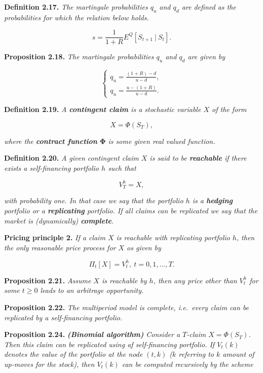 \documentclass[
]{article}
\begin{document}
\textbf{Definition 2.17.} \emph{The martingale probabilities \(q_u\) and
\(q_d\) are defined as the probabilities for which the relation below
holds.}

\[
s=\frac{1}{1+R}E^Q[S_{t+1}\ \vert\ S_t].
\]

\textbf{Proposition 2.18.} \emph{The martingale probabilities \(q_u\)
and \(q_d\) are given by}

\[
\left\{\begin{matrix}q_u=\frac{(1+R)-d}{u-d},\\ q_u=\frac{u-(1+R)}{u-d}.\end{matrix}\right.
\]

\textbf{Definition 2.19.} \emph{A \textbf{contingent claim} is a
stochastic variable \(X\) of the form}

\[
X=\Phi(S_T),
\]

\emph{where the \textbf{contract function} \(\mathbf{\Phi}\) is some
given real valued function.}

\textbf{Definition 2.20.} \emph{A given contingent claim \(X\) is said
to be \textbf{reachable} if there exists a self-financing portfolio
\(h\) such that}

\[
V_T^h=X,
\]

\emph{with probability one. In that case we say that the portfolio \(h\)
is a \textbf{hedging} portfolio or a \textbf{replicating} portfolio. If
all claims can be replicated we say that the market is
\emph{(dynamically)} \textbf{complete}.}

\textbf{Pricing principle 2.} \emph{If a claim \(X\) is reachable with
replicating portfolio \(h\), then the only reasonable price process for
\(X\) os given by}

\[
\Pi_t[X]=V_t^h,\ t=0,1,...,T.
\]

\textbf{Proposition 2.21.} \emph{Assume \(X\) is reachable by \(h\),
then any price other than \(V_t^h\) for some \(t\ge 0\) leads to an
arbitrage opportunity.}

\textbf{Proposition 2.22.} \emph{The multiperiod model is complete,
i.e.~every claim can be replicated by a self-financing portfolio.}

\textbf{Proposition 2.24.} \emph{\textbf{(Binomial algorithm)} Consider
a \(T\)-claim \(X=\Phi(S_T)\). Then this claim can be replicated using
af self-financing portfolio. If \(V_t(k)\) denotes the value of the
portfolio at the node \((t,k)\) (\(k\) referring to \(k\) amount of
up-moves for the stock), then \(V_t(k)\) can be computed recursively by
the scheme}
\end{document}
